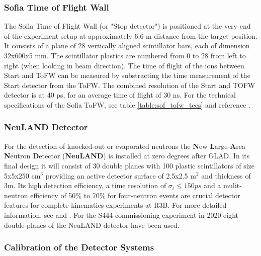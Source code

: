 \subsubsection{Sofia Time of Flight Wall}
The Sofia Time of Flight Wall (or "Stop detector") is positioned at the very end of the experiment setup at approximately 6.6 m distance from the target position. It consists of a plane of 28 vertically aligned scintillator bars, each of dimension 32x600x5 mm. The scintillator plastics are numbered from 0 to 28 from left to right (when looking in beam direction). The time of flight of the ions between Start and ToFW can be measured by substracting the time measurement of  the Start detector from the ToFW. The combined resolution of the Start and TOFW detector is at 40 ps, for an average time of flight of 30 ns\cite{martin2021fission}. For the technical specifications of the Sofia ToFW, see table \ref{table:sof_tofw_tecs} and reference \cite{bail2011time}.
\begin{figure}
\begin{floatrow}
\end{floatrow}
\end{figure}

\subsubsection{NeuLAND Detector}
For the detection of knocked-out or evaporated neutrons the \textbf{N}ew \textbf{L}arge-\textbf{A}rea \textbf{N}eutron \textbf{D}etector (\textbf{NeuLAND}) is installed at zero degrees after GLAD. In its final design it will consist of 30 double planes with 100 plastic scintillators of size 5x5x250 cm$^3$ providing an active detector surface of 2.5x2.5 m$^2$ and thickness of 3m. Its high detection efficiency, a time resolution of $\sigma_t \le 150 ps$ and a mulit-neutron efficiency of 50\% to 70\% for four-neutron events are crucial detector features for complete kinematics experiments at R3B. For more detailed information, see \cite{boretzky2021neuland} and \cite{boretzky2014neuland}.\newline
For the S444 commissioning experiment in 2020 eight double-planes of the NeuLAND detector have been used. 

\subsubsection{Calibration of the Detector Systems}
\newpage


